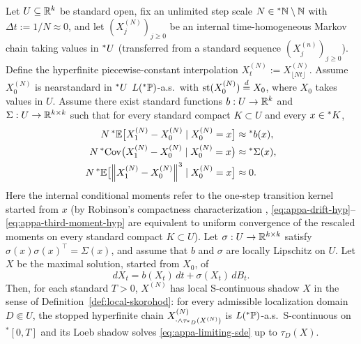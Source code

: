 \begin{theorem}
\label{thm:diffusion-approx}
Let $U \subseteq \mathbb{R}^k$ be standard open, fix an unlimited step scale $N \in {}^*\mathbb{N} \setminus \mathbb{N}$ with $\Delta t := 1/N \approx 0$, and let $(X_j^{(N)})_{j \ge 0}$ be an internal time-homogeneous Markov chain taking values in ${}^*U$ (transferred from a standard sequence $(X_j^{(n)})_{j \ge 0}$). Define the hyperfinite piecewise-constant interpolation $X_t^{(N)} := X_{\lfloor Nt \rfloor}^{(N)}$. Assume $X_0^{(N)}$ is nearstandard in ${}^*U$ $L({}^*\mathbb{P})$-a.s.\ with $\operatorname{st}(X_0^{(N)}) \stackrel{d}{=} X_0$, where $X_0$ takes values in $U$. Assume there exist standard functions $b : U \to \mathbb{R}^k$ and $\Sigma : U \to \mathbb{R}^{k \times k}$ such that for every standard compact $K \subset U$ and every $x \in {}^*K$,
\begin{align}
N\,{}^*\mathbb{E}\bigl[X_1^{(N)} - X_0^{(N)} \mid X_0^{(N)} = x\bigr] &\approx {}^*b(x), \label{eq:appa-drift-hyp} \\
N\,{}^*\!\operatorname{Cov}\bigl(X_1^{(N)} - X_0^{(N)} \mid X_0^{(N)} = x\bigr) &\approx {}^*\Sigma(x), \label{eq:appa-cov-hyp} \\
N\,{}^*\mathbb{E}\bigl[\left\lVert X_1^{(N)} - X_0^{(N)} \right\rVert^3 \mid X_0^{(N)} = x\bigr] &\approx 0. \label{eq:appa-third-moment-hyp}
\end{align}
Here the internal conditional moments refer to the one-step transition kernel started from $x$ (by Robinson's compactness characterization \cite{robinson1966nonstandard}, \eqref{eq:appa-drift-hyp}--\eqref{eq:appa-third-moment-hyp} are equivalent to uniform convergence of the rescaled moments on every standard compact $K \subset U$). Let $\sigma : U \to \mathbb{R}^{k \times k}$ satisfy $\sigma(x)\sigma(x)^\top = \Sigma(x)$, and assume that $b$ and $\sigma$ are locally Lipschitz on $U$. Let $X$ be the maximal solution, started from $X_0$, of
\begin{equation}
\label{eq:appa-limiting-sde}
dX_t = b(X_t)\,dt + \sigma(X_t)\,dB_t.
\end{equation}
Then, for each standard $T > 0$, $X^{(N)}$ has local S-continuous shadow $X$ in the sense of Definition~\ref{def:local-skorohod}: for every admissible localization domain $D \Subset U$, the stopped hyperfinite chain $X_{\cdot \wedge \tau_{{}^*D}(X^{(N)})}^{(N)}$ is $L({}^*\mathbb{P})$-a.s.\ S-continuous on ${}^*[0, T]$ and its Loeb shadow solves \eqref{eq:appa-limiting-sde} up to $\tau_D(X)$.
\end{theorem}


